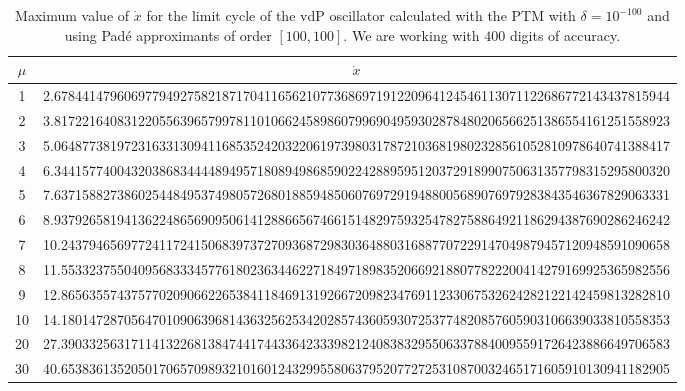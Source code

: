 \documentclass[final]{article}
\begin{document}
\begin{table}
\caption{Maximum value of $\dot{x}$ for the limit cycle of the vdP oscillator calculated with the PTM with $\delta=10^{-100}$ and using Pad\'e approximants of order $[100,100]$. We are working with $400$ digits of accuracy. }
\bigskip
\label{table_vmax_vdP}
\begin{center}
\begin{tabular}{|c|c|}
\hline
$\mu$ &   $\dot{x}$    \\
\hline
1   &   2.6784414796069779492758218717041165621077368697191220964124546113071122686772143437815944%
\\
2   &   3.8172216408312205563965799781101066245898607996904959302878480206566251386554161251558923%
\\
3   &   5.0648773819723163313094116853524203220619739803178721036819802328561052810978640741388417%
    \\
4   &   6.3441577400432038683444489495718089498685902242889595120372918990750631357798315295800320%
\\
5   &   7.6371588273860254484953749805726801885948506076972919488005689076979283843546367829063331%
\\
6   &   8.9379265819413622486569095061412886656746615148297593254782758864921186294387690286246242%
\\
7   &   10.243794656977241172415068397372709368729830364880316887707229147049879457120948591090658%
\\
8   &   11.553323755040956833345776180236344622718497189835206692188077822200414279169925365982556%
\\
9   &   12.865635574375770209066226538411846913192667209823476911233067532624282122142459813282810%
\\
10  &   14.180147287056470109063968143632562534202857436059307253774820857605903106639033810558353%
\\
20  &   27.390332563171141322681384744174433642333982124083832955063378840095591726423886649706583%
\\
30  &   40.653836135205017065709893210160124329955806379520772725310870032465171605910130941182905%

\end{tabular}
\end{center}
\end{table}
\end{document}
